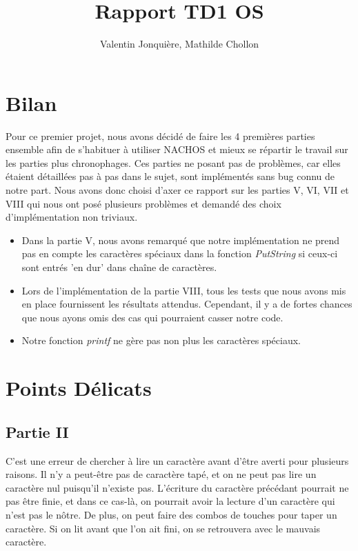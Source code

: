 \documentclass{article}
\author{
    Valentin Jonquière,
    Mathilde Chollon
}
\title{Rapport TD1 OS}
\begin{document}
\maketitle

\pagebreak

\tableofcontents

\pagebreak

\section{Bilan}

Pour ce premier projet, nous avons décidé de faire les 4 premières parties ensemble afin de
s'habituer à utiliser NACHOS et mieux se répartir le travail sur les parties plus chronophages.
Ces parties ne posant pas de problèmes, car elles étaient détaillées pas à pas dans le sujet, sont implémentés sans bug connu de notre part. Nous avons donc choisi
d'axer ce rapport sur les parties V, VI, VII et VIII qui nous ont posé plusieurs problèmes et demandé des choix 
d'implémentation non triviaux. 
\linebreak
\begin{itemize}
    \item Dans la partie V, nous avons remarqué que notre implémentation ne prend pas en compte les caractères spéciaux dans la fonction \textit{PutString} si ceux-ci
    sont entrés 'en dur' dans chaîne de caractères.
    \item Lors de l'implémentation de la partie VIII, tous les tests que nous avons mis en place fournissent les résultats attendus. Cependant, il y a de fortes 
    chances que nous ayons omis des cas qui pourraient casser notre code.
    \item Notre fonction \textit{printf} ne gère pas non plus les caractères spéciaux.
\end{itemize}
\section{Points Délicats}
\subsection{Partie II}
C'est une erreur de chercher à lire un caractère avant d'être averti pour
plusieurs raisons. Il n'y a peut-être pas de caractère tapé, et on ne peut pas
lire un caractère nul puisqu'il n'existe pas. L'écriture du caractère précédant
pourrait ne pas être finie, et dans ce cas-là, on pourrait avoir la lecture
d'un caractère qui n'est pas le nôtre. De plus, on peut faire des combos de
touches pour taper un caractère. Si on lit avant que l'on ait fini, on se
retrouvera avec le mauvais caractère.
\end{document}
